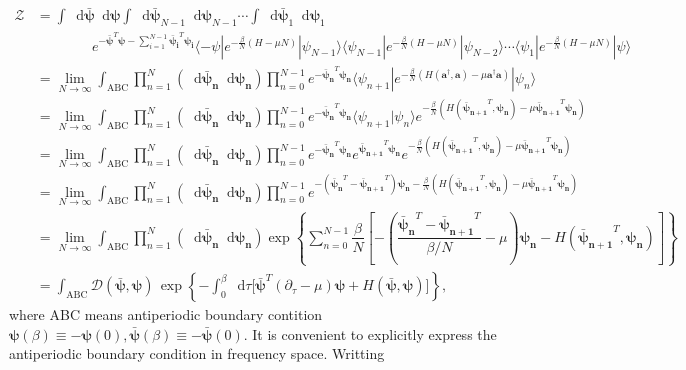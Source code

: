 \documentclass[10pt,nofootinbib]{revtex4}
\newcommand*\dd{\mathop{}\!\mathrm{d}}
\begin{document}
	\begin{align*}
		\mathcal{Z}&=\int\dd\bm{\bar\psi}\dd\bm{\psi}\int\dd\bm{\bar\psi}_{N-1}\dd\bm{\psi}_{N-1}\cdots\int\dd\bm{\bar\psi}_1\dd\bm{\psi}_1\\
		&\qquad\qquad e^{-\bm{\bar\psi}^T\bm{\psi}-\sum_{i=1}^{N-1}\bm{\bar\psi_i}^T\bm{\psi_i}}\langle-\psi|e^{-\frac{\beta}{N}(H-\mu N)}|\psi_{N-1}\rangle\langle\psi_{N-1}|e^{-\frac{\beta}{N}(H-\mu N)}|\psi_{N-2}\rangle\cdots \langle\psi_1|e^{-\frac{\beta}{N}(H-\mu N)}|\psi\rangle\\
		&=\lim_{N\rightarrow\infty}\int_{\text{ABC}}\prod_{n=1}^N\left(\dd\bm{\bar\psi_n}\dd\bm{\psi_n}\right)\prod_{n=0}^{N-1} e^{-\bm{\bar\psi_n}^T\bm{\psi_n}}\langle\psi_{n+1}|e^{-\frac{\beta}{N}(H(\bm{a}^\dagger,\bm{a})-\mu \bm{a}^\dagger\bm{a})}|\psi_n\rangle\\
		&=\lim_{N\rightarrow\infty}\int_{\text{ABC}}\prod_{n=1}^N\left(\dd\bm{\bar\psi_n}\dd\bm{\psi_n}\right)\prod_{n=0}^{N-1} e^{-\bm{\bar\psi_n}^T\bm{\psi_n}}\langle\psi_{n+1}|\psi_n\rangle e^{-\frac{\beta}{N}(H(\bm{\bar\psi_{n+1}}^T,\bm{\psi_n})-\mu \bm{\bar\psi_{n+1}}^T\bm{\psi_n})}\\
		&=\lim_{N\rightarrow\infty}\int_{\text{ABC}}\prod_{n=1}^N\left(\dd\bm{\bar\psi_n}\dd\bm{\psi_n}\right)\prod_{n=0}^{N-1} e^{-\bm{\bar\psi_n}^T\bm{\psi_n}}e^{\bm{\bar\psi_{n+1}}^T\bm{\psi_n}} e^{-\frac{\beta}{N}(H(\bm{\bar\psi_{n+1}}^T,\bm{\psi_n})-\mu \bm{\bar\psi_{n+1}}^T\bm{\psi_n})}\\
		&=\lim_{N\rightarrow\infty}\int_{\text{ABC}}\prod_{n=1}^N\left(\dd\bm{\bar\psi_n}\dd\bm{\psi_n}\right)\prod_{n=0}^{N-1} e^{-(\bm{\bar\psi_n}^T-\bm{\bar\psi_{n+1}}^T)\bm{\psi_n}-\frac{\beta}{N}(H(\bm{\bar\psi_{n+1}}^T,\bm{\psi_n})-\mu \bm{\bar\psi_{n+1}}^T\bm{\psi_n})}\\
		&=\lim_{N\rightarrow\infty}\int_{\text{ABC}}\prod_{n=1}^N\left(\dd\bm{\bar\psi_n}\dd\bm{\psi_n}\right)\exp\left\{\sum_{n=0}^{N-1} \dfrac{\beta}{N}\left[-\left(\dfrac{\bm{\bar\psi_n}^T-\bm{\bar\psi_{n+1}}^T}{\beta/N}-\mu\right)\bm{\psi_n}-H(\bm{\bar\psi_{n+1}}^T,\bm{\psi_n})\right]\right\}\\
		&=\int_{\text{ABC}}\mathcal{D}(\bm{\bar\psi},\bm{\psi})\,\exp\left\{-\int_0^\beta\dd\tau\bigg[\bm{\bar\psi}^T(\partial_\tau-\mu)\bm{\psi}+H(\bm{\bar\psi},\bm{\psi})\bigg]\right\},
	\end{align*}
	where ABC means antiperiodic boundary contition $\bm{\psi}(\beta)\equiv-\bm{\psi}(0), \bm{\bar\psi}(\beta)\equiv-\bm{\bar\psi}(0)$. It is convenient to explicitly express the antiperiodic boundary condition in frequency space. Writting
\end{document}
